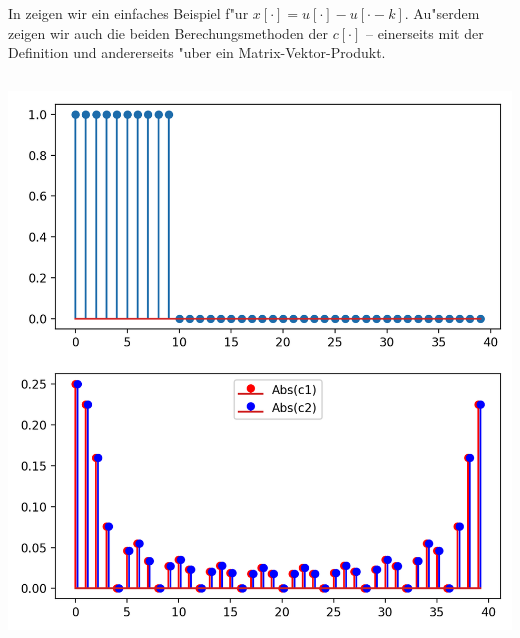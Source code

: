 In  zeigen wir ein einfaches Beispiel f"ur $x[\cdot] = u[\cdot] - u[\cdot-k]$.
Au"serdem zeigen wir auch die beiden Berechungsmethoden der $c[\cdot]$ -- einerseits mit der Definition und andererseits "uber ein Matrix-Vektor-Produkt.
%
\begin{listing}[ht]
    \noindent
    \begin{minipage}{0.51\textwidth}
        \strut\vspace*{-\baselineskip}\newline
        \inputminted[firstline=5, lastline=23]{python3}{code/dft_1.py}
    \end{minipage}%
    \begin{minipage}{0.48\textwidth}
        \strut\vspace*{-\baselineskip}\newline
        \includegraphics[width=\textwidth]{code/dft_1.png}
    \end{minipage}
    \label{py:dft_1}
\end{listing}
%
